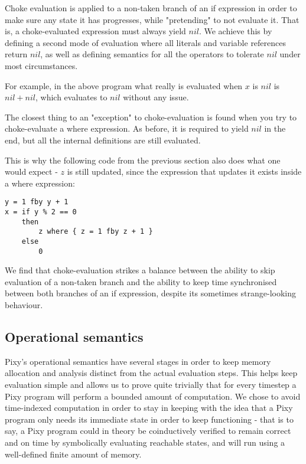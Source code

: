 \documentclass{scrartcl}
\begin{document}
    Choke evaluation is applied to a non-taken branch of an if expression in order to make sure any state it has progresses, while "pretending" to not evaluate it. That is, a choke-evaluated expression must always yield $nil$. We achieve this by defining a second mode of evaluation where all literals and variable references return $nil$, as well as defining semantics for all the operators to tolerate $nil$ under most circumstances.
    
    For example, in the above program what really is evaluated when $x$ is $nil$ is $nil + nil$, which evaluates to $nil$ without any issue.
    
    The closest thing to an "exception" to choke-evaluation is found when you try to choke-evaluate a where expression. As before, it is required to yield $nil$ in the end, but all the internal definitions are still evaluated.
    
    This is why the following code from the previous section also does what one would expect - $z$ is still updated, since the expression that updates it exists inside a where expression:
    
    \begin{lstlisting}
y = 1 fby y + 1
x = if y % 2 == 0
    then
        z where { z = 1 fby z + 1 }
    else
        0
    \end{lstlisting}
    
    We find that choke-evaluation strikes a balance between the ability to skip evaluation of a non-taken branch and the ability to keep time synchronised between both branches of an if expression, despite its sometimes strange-looking behaviour.
    
    \subsection{Operational semantics}
    
    Pixy's operational semantics have several stages in order to keep memory allocation and analysis distinct from the actual evaluation steps. This helps keep evaluation simple and allows us to prove quite trivially that for every timestep a Pixy program will perform a bounded amount of computation. We chose to avoid time-indexed computation in order to stay in keeping with the idea that a Pixy program only needs its immediate state in order to keep functioning - that is to say, a Pixy program could in theory be coinductively verified to remain correct and on time by symbolically evaluating reachable states, and will run using a well-defined finite amount of memory.
    
\end{document}
